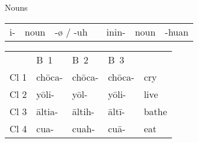 \documentclass[12pt]{beamer}
\newcommand{\nah}[1]{\textcolor{nahgrn}{#1}}
\newcommand{\trs}[1]{\textcolor{nahblu}{#1}}
\begin{document}
\begin{frame}
\begin{columns}[t]
\begin{column}{.23\linewidth}
\begin{block}{Nouns}
\begin{enumerate}
\begin{tabular}[t]{lllllll}
						\nah{i-}  & noun & \trs{-ø} / \trs{-uh} & \vline & \nah{inin-} & noun & \trs{-huan}\\
					\end{tabular}%
					\begin{example}
						\begin{tabular}{lllll}
							& B~1          & B~2          & B~3          &             \\
							Cl 1 & \nah{chōca-} & \nah{chōca-} & \nah{chōca-} & \trs{cry}   \\
							Cl 2 & \nah{yōli-}  & \nah{yōl-}   & \nah{yōli-}  & \trs{live}  \\
							Cl 3 & \nah{āltia-} & \nah{āltih-} & \nah{āltī-}  & \trs{bathe} \\
							Cl 4 & \nah{cua-}   & \nah{cuah-}  & \nah{cuā-}   & \trs{eat}
						\end{tabular}
					\end{example}
				\end{enumerate}
			\end{block}
		\end{column}
		

\end{columns}
\end{frame}
\end{document}
